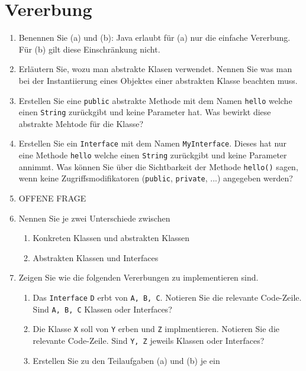 \newpage
\section{Vererbung}

\begin{enumerate}
    \item Benennen Sie (a) und (b): Java erlaubt für (a) nur die 
        einfache Vererbung. Für (b) gilt diese Einschränkung nicht.
    \item Erläutern Sie, wozu man abstrakte Klasen verwendet.
        Nennen Sie was man bei der Instantiierung eines Objektes einer 
        abstrakten Klasse beachten muss.
    \item Erstellen Sie eine \verb?public? abstrakte Methode mit dem 
        Namen \verb?hello? welche einen \verb?String? zurückgibt und
        keine Parameter hat.
        Was bewirkt diese abstrakte Mehtode für die Klasse?
    \item Erstellen Sie ein \verb?Interface? mit dem Namen 
        \verb?MyInterface?. Dieses hat  nur eine Methode \verb?hello? 
        welche einen \verb?String? zurückgibt und keine Parameter annimmt.
        Was können Sie über die Sichtbarkeit der Methode \verb?hello()?
        sagen, wenn keine Zugriffsmodifikatoren (\verb?public?, 
        \verb?private?, ...) angegeben werden?
    \item OFFENE FRAGE
    \item Nennen Sie je zwei Unterschiede zwischen
        \begin{enumerate}[label=(\alph*)]
            \item Konkreten Klassen und abstrakten Klassen
            \item Abstrakten Klassen und Interfaces
        \end{enumerate}
    \item Zeigen Sie wie die folgenden Vererbungen zu implementieren sind.
        \begin{enumerate}[label=(\alph*)]
            \item Das \verb?Interface? \verb?D? erbt von \verb?A, B, C?.
                Notieren Sie die relevante Code-Zeile. Sind \verb?A, B, C?
                Klassen oder Interfaces?
            \item Die Klasse \verb?X? soll von \verb?Y? erben und \verb?Z?
                implmentieren. Notieren Sie die relevante Code-Zeile.
                Sind \verb?Y, Z? jeweils Klassen oder Interfaces?
            \item Erstellen Sie zu den Teilaufgaben (a) und (b) je ein 

\end{enumerate}
\end{enumerate}
